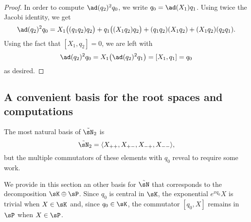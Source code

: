 \begin{proof}
	In order to compute $\ad(q_2)^2q_0$, we write $q_0=\ad(X_1)q_1$. Using twice the Jacobi identity, we get
	\begin{equation}
		\ad(q_2)^2q_0=X_1\big( (q_1q_2)q_2 \big)+q_1\big( (X_1q_2)q_2 \big)+(q_1q_2)(X_1q_2)+(X_1q_2)(q_2q_1).
	\end{equation}
	Using the fact that $[X_1,q_2]=0$, we are left with
	\begin{equation}
		\ad(q_2)^2q_0=X_1\big( \ad(q_2)^2q_1 \big)=[X_1,q_1]=q_0
	\end{equation}
	as desired.
\end{proof}


%
\subsection{A convenient basis for the root spaces and computations}
%
\label{LONGSubSecMOreConvBasisBlbla}
%

The most natural basis of $\tilde\sN_2$ is
\begin{equation}
	\tilde\sN_2=\langle X_{++},X_{+-},X_{-+},X_{--}\rangle,
\end{equation}
but the multiple commutators of these elements with $q_0$ reveal to require some work.

We provide in this section an other basis for $\tilde\sN$ that corresponds to the decomposition $\sK\oplus\sP$. Since $q_0$ is central in $\sK$, the exponential $e^{xq_0}X$ is trivial when $X\in\sK$ and, since $q_0\in\sK$, the commutator $[q_0,X]$ remains in $\sP$ when $X\in\sP$.

